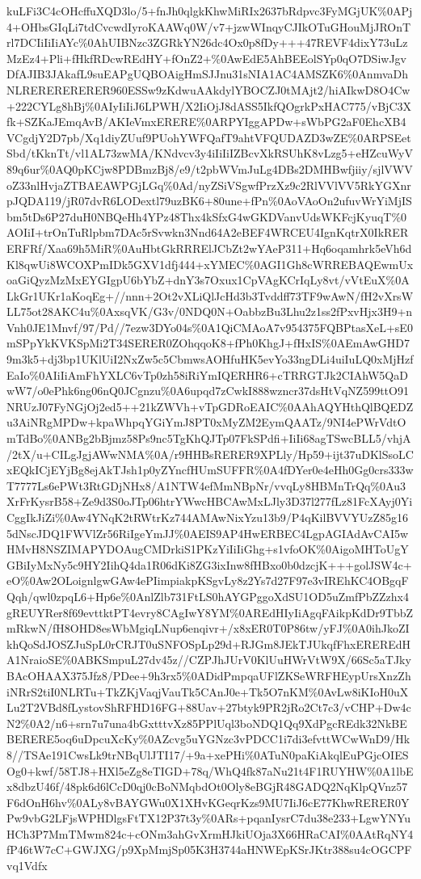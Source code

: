 \documentclass[]{article}
\begin{document}
kuLFi3C4cOHcffuXQD3lo/5+fnJh0qlgkKhwMiRIx2637bRdpvc3FyMGjUK\%0APj4+OHbsGIqLi7tdCvcwdIyroKAAWq0W/v7+jzwWInqyCJIkOTuGHouMjJROnTrl7DCIiIiIiAYc\%0AhUIBNzc3ZGRkYN26dc4Ox0p8fDy+++47REVF4dixY73uLzMzEz4+Pli+fHkfRDcwREdHY+fOnZ2+\%0AwEdE5AhBEEolSYp0qO7DSiwJgvDfAJIB3JAkafL9suEAPgUQBOAigHmSJJnu31sNIA1AC4AMSZK6\%0AnmvaDhNLRERERERERER960ESSw9zKdwuAAkdylYBOCZJ0tMAjt2/hiAIkwD8O4Cw+222CYLg8hBj\%0AIyIiIiJ6LPWH/X2IiOjJ8dASS5IkfQOgrkPxHAC775/vBjC3Xfk+SZKaJEmqAvB/AKIeVmxERERE\%0ARPYIggAPDw+sWbPG2aF0EhcXB4VCgdjY2D7pb/Xq1diyZUuf9PUohYWFQafT9ahtVFQUDAZD3wZE\%0ARPSEetSbd/tKknTt/vl1AL73zwMA/KNdvcv3y4iIiIiIZBcvXkRSUhK8vLzg5+eHZcuWyV89q6ur\%0AQ0pKCjw8PDBmzBj8/e9/t2pbWVmJuLg4DBs2DMHBwfjiiy/sjlVWVoZ33nlHvjaZTBAEAWPGjLGq\%0Ad/nyZSiVSgwfPrzXz9c2RlVVlVV5RkYGXnrpJQDA119/jR07dvR6LODextl79uzBK6+80une+fPn\%0AoVAoOn2ufuvWrYiMjISbm5tDs6P27duH0NBQeHh4YPz48Thx4kSfxG4wGKDVanvUdsWKFcjKyuqT\%0AOIiI+trOnTuRlpbm7DAc5rSvwkn3Nnd64A2eBEF4WRCEU4IgnKqtrX0IkRERERFRf/Xaa69h5MiR\%0AuHbtGkRRRElJCbZt2wYAeP311+Hq6oqamhrk5eVh6dKl8qwUi8WCOXPmIDk5GXV1dfj444+xYMEC\%0AGI1Gh8cWRREBAQEwmUxoaGiQyzMzMxEYGIgpU6bYbZ+dnY3s7Oxux1CpVAgKCrIqLy8vt/vVtEuX\%0ALkGr1UKr1aKoqEg+//nnn+2Ot2vXLiQlJcHd3b3Tvddff73TF9wAwN/fH2vXrsWLL75ot28AKC4u\%0AxsqVK/G3v/0NDQ0N+OabbzBu3Lhu2z1ss2fPxvHjx3H9+nVnh0JE1Mnvf/97/Pd//7ezw3DYo04s\%0A1QiCMAoA7v954375FQBPtasXeL+sE0mSPpYkKVKSpMi2T34SERER0ZOhqqoK8+fPh0KhgJ+fHxIS\%0AEmAwGHD79m3k5+dj3bp1UKlUiI2NxZw5c5CbmwsAOHfuHK5evYo33ngDLi4uiIuLQ0xMjHzfEaIo\%0AIiIiAmFhYXLC6vTp0zh58iRiYmIQERHR6+cTRRGTJk2CIAhW5QaDwW7/o0ePhk6ng06nQ0JCgnzu\%0A6upqd7zCwkI888wzncr37dsHtVqNZ599ttO91NRUzJ07FyNGjOj2ed5++21kZWVh+vTpGDRoEAIC\%0AAhAQYHthQlBQEDZu3AiNRgMPDw+kpaWhpqYGiYmJ8PT0xMyZM2EymQAATz/9NI4ePWrVdtOmTdBo\%0ANBg2bBjmz58Ps9nc5TgKhQJTp07FkSPdfi+IiIi68agTSwcBLL5/vhjA/2tX/u+CILgJgjAWwNMA\%0A/r9HHBsRERER9XPLly/Hp59+ijt37uDKlSsoLCxEQkICjEYjBg8ejAkTJsh1p0yZYncfHUmSUFFR\%0A4fDYer0e4eHh0Gg0crs333wT7777Ls6ePWt3RtGDjNHx8/A1NTW4efMmNBpNr/vvqLy8HBMnTrQq\%0Au3XrFrKysrB58+Ze9d3S0oJTp06htrYWwcHBCAwMxLJly3D37l277fLz81FcXAyj0YiCggIkJiZi\%0Aw4YNqK2tRWtrKz744AMAwNixYzu13b9/P4qKilBVVYUzZ85g165dNscJDQ1FWVlZr56RiIgeYmJJ\%0AEIS9AP4HwERBEC4LgpAGIAdAvCAI5wHMvH8NSZIMAPYDOAugCMDrkiS1PKzYiIiIiGhg+s1vfoOK\%0AigoMHToUgYGBiIyMxNy5c9HY2IihQ4da1R06dKi8ZG3ixInw8fHBxo0b0dzcjK+++golJSW4c+eO\%0Aw2OLoignlgwGAw4ePIimpiakpKSgvLy8z2Ys7d27F97e3vIREhKC4OBgqFQqh/qwl0zpqL6+Hp6e\%0AnlZlb731FtLS0hAYGPggoXdSU1OD5uZmfPbZZzhx4gREUYRer8f69evttktPT4evry8CAgIwY8YM\%0AREdHIyIiAgqFAikpKdDr9TbbZmRkwN/fH8OHD8esWbMgiqLNup6enqivr+/x8xER0T0P86tw/yFJ\%0A0ihJkoZIkhQoSdJOSZJuSpL0rCRJT0uSNFOSpLp29d+RJGm8JEkTJUkqfFhxEREREdHA1NraioSE\%0ABKSmpuL27dv45z//CZPJhJUrV0KlUuHWrVtW9X/66Sc5aTJkyBAcOHAAX375Jfz8/PDee+9h3rx5\%0ADidPmpqaUFlZKSeWRFHEypUrsXnzZhiNRrS2tiI0NLRTu+TkZKjVaqjVauTk5CAnJ0e+Tk5O7nKM\%0AvLw8iKIoH0uXLu2T2VBd8fLystovShRFHD16FG+88Uav+27btyk9PR2jRo2Ct7c3/vCHP+Dw4cN2\%0A2/n6+srn7u7una4bGxtttvXz85PPlUql3boNDQ1Qq9XdPgcREdk32NkBEBERERE5oq6uDpcuXcKy\%0AZcvg5uYGNzc3vPDCC1i7di3efvttWCwWnD9/Hk8//TSAe191CwsLk9trNBqUlJTI17/+9a+xePHi\%0ATuN0paKiAkqlEuPGjcOIESOg0+kwf/58TJ8+HXl5eZg8eTIGD+78q/WhQ4fk87aNu21t4F1RUYHW\%0A1lbEx8dbzU46f/48pk6d6lCcD0qj0cBoNMqbdOt0Oly8eBGjR48GADQ2NqKlpQVnz57F6dOnH6hv\%0ALy8vBAYGWu0X1XHvKGeqrKzs9MU7IiJ6cE77KhwRERER0YPw9vbG2LFjsWPHDlgsFtTX12P37t3y\%0ARs+pqanIysrC7du38e233+LgwYNYuHCh3P7MmTMwm824c+cONm3ahGvXrmHJkiUOja3X66HRaCAI\%0AAtRqNY4fP46tW7cC+GWJXG/p9XpMmjSp05K3H3744aHNWEpKSrJKtr388su4cOGCPFvq1Vdfx
\end{document}
